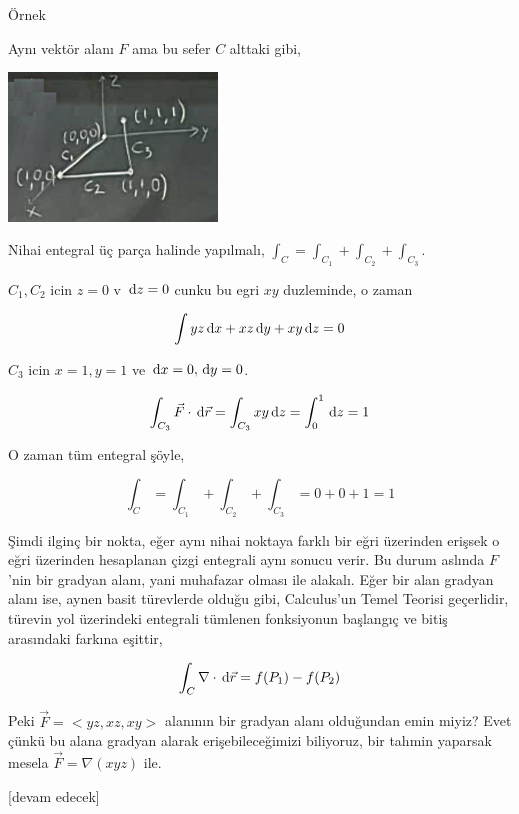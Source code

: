 \documentclass[12pt,fleqn]{article}\usepackage{../../common}
\begin{document}
Örnek

Aynı vektör alanı $F$ ama bu sefer $C$ alttaki gibi,

\includegraphics[width=15em]{calc_multi_30_01.jpg}

Nihai entegral üç parça halinde yapılmalı, $\int_C = \int_{C_1} + \int_{C_2} + \int_{C_3}$. 

$C_1,C_2$ icin $z=0$ v $\,\mathrm{d} z = 0$ cunku bu egri $xy$ duzleminde, o zaman 

$$
\int yz \,\mathrm{d} x + xz \,\mathrm{d} y + xy \,\mathrm{d} z = 0
$$

$C_3$ icin $x=1,y=1$ ve $\,\mathrm{d} x = 0, \,\mathrm{d} y = 0$. 

$$
\int_{C_3} \vec{F} \cdot \,\mathrm{d} \vec{r} =
\int_{C_3} xy \,\mathrm{d} z = \int_{0}^{1} \,\mathrm{d} z = 1
$$

O zaman tüm entegral şöyle,

$$
\int_C = \int_{C_1} + \int_{C_2} + \int_{C_3} = 0 + 0 + 1 = 1
$$

Şimdi ilginç bir nokta, eğer aynı nihai noktaya farklı bir eğri üzerinden
erişsek o eğri üzerinden hesaplanan çizgi entegrali aynı sonucu verir. Bu durum
aslında $F$'nin bir gradyan alanı, yani muhafazar olması ile alakalı. Eğer bir
alan gradyan alanı ise, aynen basit türevlerde olduğu gibi, Calculus'un Temel
Teorisi geçerlidir, türevin yol üzerindeki entegrali tümlenen fonksiyonun
başlangıç ve bitiş arasındaki farkına eşittir,

$$
\int_C \nabla \cdot \,\mathrm{d} \vec{r} = f(P_1) - f(P_2)
$$

Peki $\vec{F} = < yz, xz, xy >$ alanının bir gradyan alanı olduğundan emin
miyiz? Evet çünkü bu alana gradyan alarak erişebileceğimizi biliyoruz, bir
tahmin yaparsak mesela $\vec{F} = \nabla (xyz)$ ile.












[devam edecek]
\end{document}
